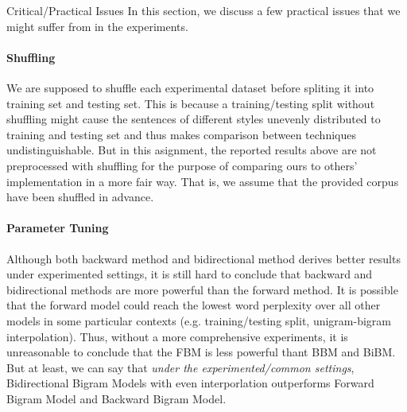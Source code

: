\documentclass[11pt,a4paper]{article}
\begin{document}
\begin{section}{Critical/Practical Issues}
    In this section, we discuss a few practical issues that we might suffer
    from in the experiments. 
\paragraph{Shuffling}
We are supposed to shuffle each experimental dataset before
spliting it into training set and testing set. This is because a
training/testing split without shuffling might cause the sentences of
different styles unevenly distributed to training and testing set and thus
makes comparison between techniques undistinguishable. 
But in this asignment, the reported results above are not preprocessed with
shuffling for the purpose of comparing ours to others' implementation in a
more fair way. That is, we assume that the provided corpus have been shuffled
in advance.
\end{section}
\paragraph{Parameter Tuning} Although both backward method and bidirectional
method derives better results under experimented settings, it is still hard to
conclude that backward and bidirectional methods are more powerful than the
forward method. It is possible that the forward model could reach the lowest
word perplexity over all other models in some particular contexts (e.g.
training/testing split, unigram-bigram interpolation). Thus, without a more
comprehensive experiments, it is unreasonable to conclude that the FBM is less
powerful thant BBM and BiBM. But at least, we can say that \textit{under
    the experimented/common settings}, Bidirectional Bigram Models with even
interporlation outperforms Forward Bigram Model and Backward Bigram Model.


\end{document}
